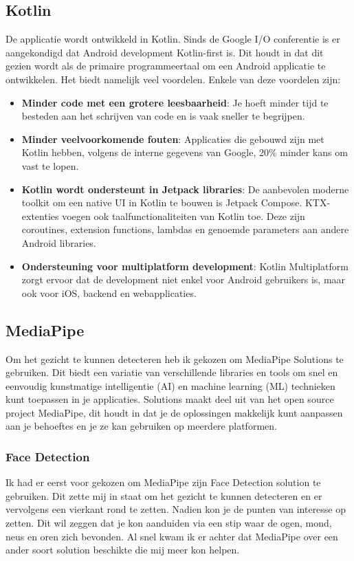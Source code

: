 \subsection{Kotlin}
De applicatie wordt ontwikkeld in Kotlin. Sinds de Google I/O conferentie is er aangekondigd dat Android development Kotlin-first is. Dit houdt in dat dit gezien wordt als de primaire programmeertaal om een Android applicatie te ontwikkelen. Het biedt namelijk veel voordelen. Enkele van deze voordelen zijn:
\begin{itemize}
    \item \textbf{Minder code met een grotere leesbaarheid}: Je hoeft minder tijd te besteden aan het schrijven van code en is vaak sneller te begrijpen.
    \item \textbf{Minder veelvoorkomende fouten}: Applicaties die gebouwd zijn met Kotlin hebben, volgens de interne gegevens van Google, 20\% minder kans om vast te lopen.
    \item \textbf{Kotlin wordt ondersteunt in Jetpack libraries}: De aanbevolen moderne toolkit om een native UI in Kotlin te bouwen is Jetpack Compose. KTX-extenties voegen ook taalfunctionaliteiten van Kotlin toe. Deze zijn coroutines, extension functions, lambdas en genoemde parameters aan andere Android libraries.
    \item \textbf{Ondersteuning voor multiplatform development}: Kotlin Multiplatform zorgt ervoor dat de development niet enkel voor Android gebruikers is, maar ook voor iOS, backend en webapplicaties.
\end{itemize}

\subsection{MediaPipe}
Om het gezicht te kunnen detecteren heb ik gekozen om MediaPipe Solutions te gebruiken. Dit biedt een variatie van verschillende libraries en tools om snel en eenvoudig kunstmatige intelligentie (AI) en machine learning (ML) technieken kunt toepassen in je applicaties. Solutions maakt deel uit van het open source project MediaPipe, dit houdt in dat je de oplossingen makkelijk kunt aanpassen aan je behoeftes en je ze kan gebruiken op meerdere platformen.
\subsubsection{Face Detection}
Ik had er eerst voor gekozen om MediaPipe zijn Face Detection solution te gebruiken. Dit zette mij in staat om het gezicht te kunnen detecteren en er vervolgens een vierkant rond te zetten. Nadien kon je de punten van interesse op zetten. Dit wil zeggen dat je kon aanduiden via een stip waar de ogen, mond, neus en oren zich bevonden. Al snel kwam ik er achter dat MediaPipe over een ander soort solution beschikte die mij meer kon helpen.
